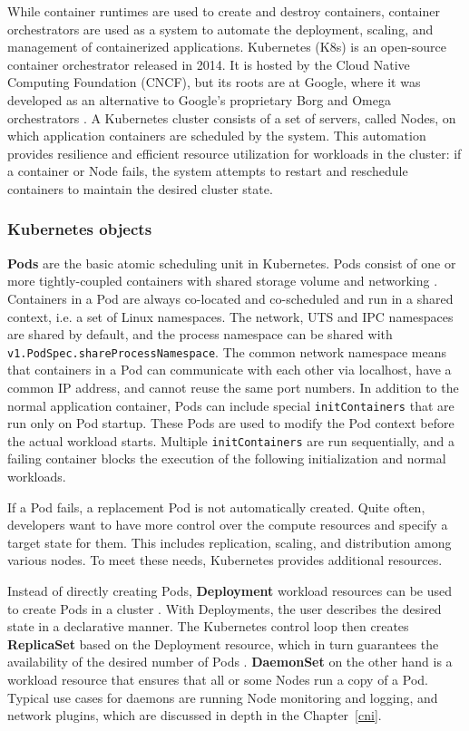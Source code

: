 \documentclass[english, 12pt, a4paper, sci, utf8, a-2b, online]{aaltothesis}
\begin{document}
While container runtimes are used to create and destroy containers, container orchestrators are used as a system to automate the deployment, scaling, and management of containerized applications.
Kubernetes (K8s) \cite{kubernetes} is an open-source container orchestrator released in 2014.
It is hosted by the Cloud Native Computing Foundation (CNCF), but its roots are at Google, where it was developed as an alternative to Google's proprietary Borg and Omega orchestrators \cite{burns2016borg}.
A Kubernetes cluster consists of a set of servers, called Nodes, on which application containers are scheduled by the system.
This automation provides resilience and efficient resource utilization for workloads in the cluster: if a container or Node fails, the system attempts to restart and reschedule containers to maintain the desired cluster state.

\subsubsection{Kubernetes objects}

\textbf{Pods} are the basic atomic scheduling unit in Kubernetes.
Pods consist of one or more tightly-coupled containers with shared storage volume and networking \cite{k8s-docs-pods}.
Containers in a Pod are always co-located and co-scheduled and run in a shared context, i.e. a set of Linux namespaces.
The network, UTS and IPC namespaces are shared by default, and the process namespace can be shared with \texttt{v1.PodSpec.shareProcessNamespace}.
The common network namespace means that containers in a Pod can communicate with each other via localhost, have a common IP address, and cannot reuse the same port numbers.
In addition to the normal application container, Pods can include special \texttt{initContainers} that are run only on Pod startup.
These Pods are used to modify the Pod context before the actual workload starts.
Multiple \texttt{initContainers} are run sequentially, and a failing container blocks the execution of the following initialization and normal workloads.

If a Pod fails, a replacement Pod is not automatically created.
Quite often, developers want to have more control over the compute resources and specify a target state for them.
This includes replication, scaling, and distribution among various nodes.
To meet these needs, Kubernetes provides additional resources.

Instead of directly creating Pods, \textbf{Deployment} workload resources can be used to create Pods in a cluster \cite{k8s-docs-pods}.
With Deployments, the user describes the desired state in a declarative manner.
The Kubernetes control loop then creates \textbf{ReplicaSet} based on the Deployment resource, which in turn guarantees the availability of the desired number of Pods \cite{k8s-docs-deployment}.
\textbf{DaemonSet} on the other hand is a workload resource that ensures that all or some Nodes run a copy of a Pod.
Typical use cases for daemons are running Node monitoring and logging, and network plugins, which are discussed in depth in the Chapter~\ref{cni}.
\end{document}
